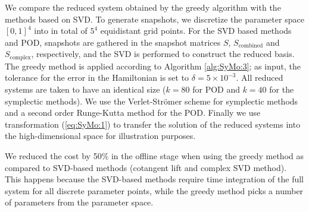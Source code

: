 We compare the reduced system obtained by the greedy algorithm with the methods based on SVD. To generate snapshots, we discretize the parameter space $[0,1]^4$ into in total of $5^4$ equidistant grid points. For the SVD based methods and POD, snapshots are gathered in the snapshot matrices $S$, $S_{\text{combined}}$ and $S_{\text{complex}}$, respectively, and the SVD is performed to construct the reduced basis. The greedy method is applied according to Algorithm \ref{alg:SyMo:3}; as input, the tolerance for the error in the Hamiltonian is set to $\delta = 5 \times 10^{-3}$. All reduced systems are taken to have an identical size ($k=80$ for POD and $k=40$ for the symplectic methods). We use the Verlet-Str\"omer scheme for symplectic methods and a second order Runge-Kutta method for the POD. Finally we use transformation (\ref{eq:SyMo:1}) to transfer the solution of the reduced systems into the high-dimensional space for illustration purposes.



We reduced the cost by 50\% in the offline stage when using the greedy method as compared to SVD-based methods (cotangent lift and complex SVD method). This happens because the SVD-based methods require time integration of the full system for all discrete parameter points, while the greedy method picks a number of parameters from the parameter space. 


%
%




